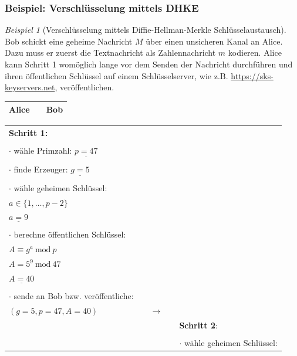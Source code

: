 \documentclass[
  a4paper,
  11pt,
]{scrartcl}
\theoremstyle{plain}
\theoremstyle{definition}
\theoremstyle{remark}
\newtheorem{beispiel}{Beispiel}
\newcommand{\Mod}[1]{\ \mathrm{mod}\ #1}
\begin{document}
\subsubsection{Beispiel: Verschlüsselung mittels DHKE}
\label{sub:enc_with_dhke_example}
\begin{beispiel}[Verschlüsselung mittels Diffie-Hellman-Merkle Schlüsselaustausch]
  Bob schickt eine geheime Nachricht $M$ über einen unsicheren Kanal an Alice.
  Dazu muss er zuerst die Textnachricht als Zahlennachricht $m$ kodieren.
  Alice kann Schritt 1 womöglich lange vor dem Senden der Nachricht durchführen und ihren 
  öffentlichen Schlüssel auf einem Schlüsselserver, wie z.B.
  \url{https://sks-keyservers.net}, veröffentlichen.
  \begin{center}
    \begin{tabularx}{\textwidth}{lXr}
      \textbf{Alice} & & \textbf{Bob}\\
      \midrule
    \end{tabularx}
    \begin{tabularx}{\textwidth}{lXcXl}
      \textbf{Schritt 1:} & & & & \\
      & & & & \\
      $\cdot$ wähle Primzahl: $\underline{p = 47}$ & & & & \\
      & & & & \\
      $\cdot$ finde Erzeuger: $\underline{g = 5}$ & & & & \\
      & & & & \\
      $\cdot$ wähle geheimen Schlüssel: & & & & \\
      $a \in \{1, \dots, p-2\}$ & & & & \\
      $\underline{a = 9}$ & & & & \\
      & & & & \\
      $\cdot$ berechne öffentlichen Schlüssel: & & & & \\
      $A \equiv g^a \Mod{p}$ & & & & \\
      $A = 5^{9} \Mod{47}$ & & & & \\
      $\underline{A = 40}$ & & & & \\
      & & & & \\
      $\cdot$ sende an Bob bzw. veröffentliche: & & & & \\
      $(g = 5, p = 47, A = 40)$ & & $\to$ & & \\\midrule
      & & & & \textbf{Schritt 2}:\\
      & & & & \\
      & & & & $\cdot$ wähle geheimen Schlüssel:\\

\end{tabularx}
\end{center}
\end{beispiel}
\end{document}

